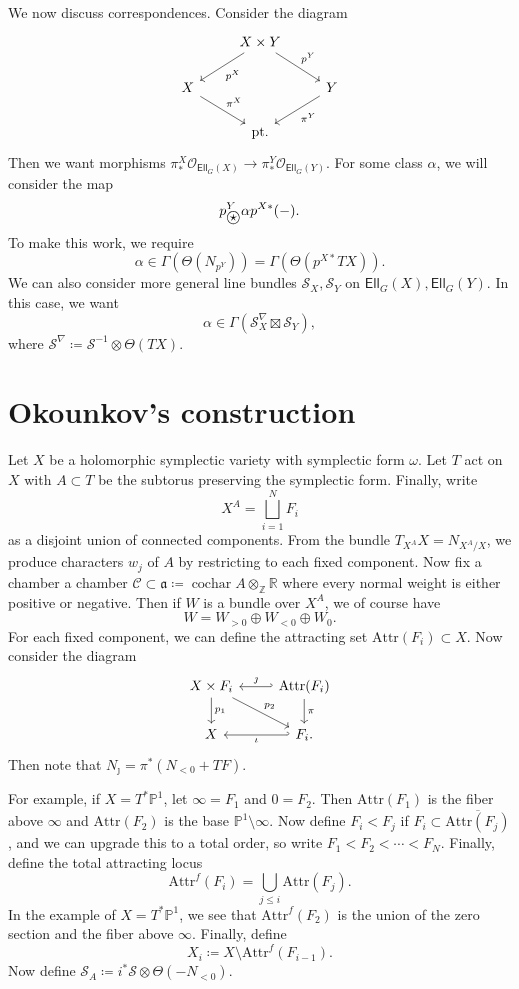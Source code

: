 \documentclass[leqno, openany]{memoir}
\theoremstyle{definition}
\theoremstyle{remark}
\theoremstyle{plain}
\theoremstyle{definition}
\theoremstyle{remark}
\newcommand{\R}{\mathbb{R}}
\newcommand{\Z}{\mathbb{Z}}
\renewcommand{\P}{\mathbb{P}}
\newcommand{\mc}[1]{\mathcal{#1}}
\newcommand{\mf}[1]{\mathfrak{#1}}
\newcommand{\mr}[1]{\mathrm{#1}}
\newcommand{\ms}[1]{\mathsf{#1}}
\newcommand{\on}[1]{\operatorname{#1}}
\newcommand{\ol}[1]{\overline{#1}}
\newcommand{\ostar}{\stackMath\mathbin{\stackinset{c}{0ex}{c}{0ex}{\star}{\bigcirc}}}
\begin{document}
We now discuss correspondences. Consider the diagram
\begin{equation*}
\begin{tikzcd}
    & X \times Y \ar{dl}{p^X} \ar{dr}{p^Y} \\
    X \ar{dr}{\pi^X} & & Y \ar{dl}{\pi^Y} \\
    & \mr{pt}.
\end{tikzcd}
\end{equation*}
Then we want morphisms $\pi_*^X \mc{O}_{\ms{Ell}_G(X)} \to \pi_*^Y \mc{O}_{\ms{Ell}_G(Y)}$. For some class $\alpha$, we will consider the map
\[ p^Y_{\ostar} \alpha p^{X*}(-). \]
To make this work, we require
\[ \alpha \in \Gamma (\Theta(N_{p^Y})) = \Gamma (\Theta(p^{X*} TX)). \]
We can also consider more general line bundles $\mc{S}_X, \mc{S}_Y$ on $\ms{Ell}_G(X), \ms{Ell}_G(Y)$. In this case, we want
\[ \alpha \in \Gamma(\mc{S}_X^{\nabla} \boxtimes \mc{S}_Y), \]
where $\mc{S}^{\nabla} \coloneqq \mc{S}^{-1} \otimes \Theta(TX)$.

\section{Okounkov's construction}

Let $X$ be a holomorphic symplectic variety with symplectic form $\omega$. Let $T$ act on $X$ with $A \subset T$ be the subtorus preserving the symplectic form. Finally, write
\[ X^A = \bigsqcup_{i=1}^N F_i \]
as a disjoint union of connected components. From the bundle $T_{X^A} X = N_{X^A/X}$, we produce characters $w_j$ of $A$ by restricting to each fixed component. Now fix a chamber a chamber $\mc{C} \subset \mf{a} \coloneqq \on{cochar} A \otimes_{\Z} \R$ where every normal weight is either positive or negative. Then if $W$ is a bundle over $X^A$, we of course have
\[ W = W_{>0} \oplus W_{<0} \oplus W_0. \]
For each fixed component, we can define the attracting set $\mr{Attr}(F_i) \subset X$. Now consider the diagram
\begin{equation*}
\begin{tikzcd}
    X \times F_i \ar{d}{p_1} \ar[hookleftarrow]{r}{\jmath} \ar{dr}{p_2} & \mr{Attr}(F_i)  \ar{d}{\pi} \\
    X \ar[hookleftarrow,swap]{r}{\iota} & F_i.
\end{tikzcd}
\end{equation*}
Then note that $N_{\jmath} = \pi^* (N_{<0} + TF)$.

For example, if $X = T^* \P^1$, let $\infty = F_1$ and $0 = F_2$. Then $\mr{Attr}(F_1)$ is the fiber above $\infty$ and $\mr{Attr}(F_2)$ is the base $\P^1 \setminus \infty$. Now define $F_i < F_j$ if $F_i \subset \ol{\mr{Attr}(F_j)}$, and we can upgrade this to a total order, so write $F_1 < F_2 < \cdots < F_N$. Finally, define the total attracting locus
\[ \mr{Attr}^f(F_i) = \bigcup_{j \leq i} \mr{Attr}(F_j). \]
In the example of $X = T^* \P^1$, we see that $\mr{Attr}^f(F_2)$ is the union of the zero section and the fiber above $\infty$. Finally, define
\[ X_i \coloneqq X \setminus \mr{Attr}^f(F_{i-1}). \]
Now define $\mc{S}_A \coloneqq i^* \mc{S} \otimes \Theta(-N_{<0})$.
\end{document}
